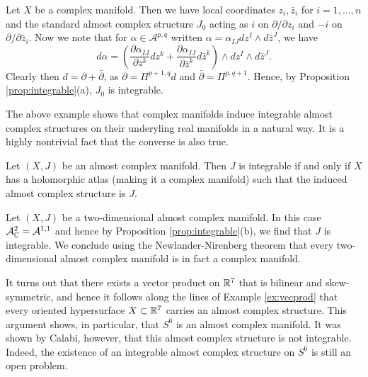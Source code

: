 \documentclass{amsart}
\begin{document}
\begin{example}
    Let $X$ be a complex manifold. Then we have local coordinates $z_i,\bar z_i$
    for $i=1,\ldots,n$ and the standard almost complex structure $J_0$ 
    acting as $i$ on $\partial/\partial z_i$ and $-i$ on $\partial/\partial\bar z_i$.
    Now we note that for $\alpha\in\mathcal{A}^{p,q}$ written $\alpha=\alpha_{IJ}dz^I\wedge d\bar z^J$,
    we have
    \begin{equation*}
        d\alpha = \left(\frac{\partial\alpha_{IJ}}{\partial z^k}dz^k+\frac{\partial\alpha_{IJ}}{\partial\bar z^k}d\bar z^k\right)\wedge dz^I\wedge d\bar z^J.
    \end{equation*}
    Clearly then $d=\partial + \bar\partial$, as $\partial=\Pi^{p+1,q}d$ and $\bar\partial=\Pi^{p,q+1}$.
    Hence, by Proposition \ref{prop:integrable}(a), $J_0$ is integrable.
\end{example}

The above example shows that complex manifolds induce integrable almost complex
structures on their underyling real manifolds in a natural way. It is a highly
nontrivial fact that the converse is also true.

\begin{theorem}
    Let $(X,J)$ be an almost complex manifold. Then $J$ is integrable if and only if
    $X$ has a holomorphic atlas (making it a complex manifold) such that the induced almost
    complex structure is $J$.
\end{theorem}

\begin{example}
    Let $(X,J)$ be a two-dimensional almost complex manifold. In this case
    $\mathcal{A}^2_{\mathbb{C}}=\mathcal{A}^{1,1}$ and hence by Proposition \ref{prop:integrable}(b),
    we find that $J$ is integrable. We conclude using the Newlander-Nirenberg theorem
    that every two-dimensional almost complex manifold is in fact a complex manifold.
    \label{ex:riemannintegrable}
\end{example}

\begin{example}
    It turns out that there exists a vector product on $\mathbb{R}^7$ that is bilinear and skew-symmetric,
    and hence it follows along the lines of Example \ref{ex:vecprod} that every oriented
    hypersurface $X\subset\mathbb{R}^7$ carries an almost complex structure. This argument shows, in
    particular, that $S^6$ is an almost complex manifold. It was shown by Calabi, however,
    that this almost complex structure is not integrable. Indeed, the existence of an integrable
    almost complex structure on $S^6$ is still an open problem.
\end{example}
\end{document}
